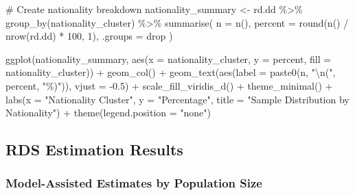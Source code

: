 \documentclass[
  12pt,
  letterpaper,
  DIV=11,
  numbers=noendperiod]{scrartcl}
\newenvironment{Shaded}{\begin{snugshade}}{\end{snugshade}}
\newcommand{\AttributeTok}[1]{\textcolor[rgb]{0.40,0.45,0.13}{#1}}
\newcommand{\CommentTok}[1]{\textcolor[rgb]{0.37,0.37,0.37}{#1}}
\newcommand{\DecValTok}[1]{\textcolor[rgb]{0.68,0.00,0.00}{#1}}
\newcommand{\FloatTok}[1]{\textcolor[rgb]{0.68,0.00,0.00}{#1}}
\newcommand{\FunctionTok}[1]{\textcolor[rgb]{0.28,0.35,0.67}{#1}}
\newcommand{\NormalTok}[1]{\textcolor[rgb]{0.00,0.23,0.31}{#1}}
\newcommand{\OtherTok}[1]{\textcolor[rgb]{0.00,0.23,0.31}{#1}}
\newcommand{\SpecialCharTok}[1]{\textcolor[rgb]{0.37,0.37,0.37}{#1}}
\newcommand{\StringTok}[1]{\textcolor[rgb]{0.13,0.47,0.30}{#1}}
\theoremstyle{plain}
\theoremstyle{definition}
\begin{document}
\begin{Shaded}
\begin{Highlighting}[]
\CommentTok{\# Create nationality breakdown}
\NormalTok{nationality\_summary }\OtherTok{\textless{}{-}}\NormalTok{ rd.dd }\SpecialCharTok{\%\textgreater{}\%}
  \FunctionTok{group\_by}\NormalTok{(nationality\_cluster) }\SpecialCharTok{\%\textgreater{}\%}
  \FunctionTok{summarise}\NormalTok{(}
    \AttributeTok{n =} \FunctionTok{n}\NormalTok{(),}
    \AttributeTok{percent =} \FunctionTok{round}\NormalTok{(}\FunctionTok{n}\NormalTok{() }\SpecialCharTok{/} \FunctionTok{nrow}\NormalTok{(rd.dd) }\SpecialCharTok{*} \DecValTok{100}\NormalTok{, }\DecValTok{1}\NormalTok{),}
    \AttributeTok{.groups =} \StringTok{\textquotesingle{}drop\textquotesingle{}}
\NormalTok{  )}

\FunctionTok{ggplot}\NormalTok{(nationality\_summary, }\FunctionTok{aes}\NormalTok{(}\AttributeTok{x =}\NormalTok{ nationality\_cluster, }\AttributeTok{y =}\NormalTok{ percent, }\AttributeTok{fill =}\NormalTok{ nationality\_cluster)) }\SpecialCharTok{+}
  \FunctionTok{geom\_col}\NormalTok{() }\SpecialCharTok{+}
  \FunctionTok{geom\_text}\NormalTok{(}\FunctionTok{aes}\NormalTok{(}\AttributeTok{label =} \FunctionTok{paste0}\NormalTok{(n, }\StringTok{"}\SpecialCharTok{\textbackslash{}n}\StringTok{("}\NormalTok{, percent, }\StringTok{"\%)"}\NormalTok{)), }\AttributeTok{vjust =} \SpecialCharTok{{-}}\FloatTok{0.5}\NormalTok{) }\SpecialCharTok{+}
  \FunctionTok{scale\_fill\_viridis\_d}\NormalTok{() }\SpecialCharTok{+}
  \FunctionTok{theme\_minimal}\NormalTok{() }\SpecialCharTok{+}
  \FunctionTok{labs}\NormalTok{(}\AttributeTok{x =} \StringTok{"Nationality Cluster"}\NormalTok{, }\AttributeTok{y =} \StringTok{"Percentage"}\NormalTok{, }
       \AttributeTok{title =} \StringTok{"Sample Distribution by Nationality"}\NormalTok{) }\SpecialCharTok{+}
  \FunctionTok{theme}\NormalTok{(}\AttributeTok{legend.position =} \StringTok{"none"}\NormalTok{)}
\end{Highlighting}
\end{Shaded}

\subsection{RDS Estimation Results}\label{rds-estimation-results}

\subsubsection{Model-Assisted Estimates by Population
Size}\label{model-assisted-estimates-by-population-size}
\end{document}
